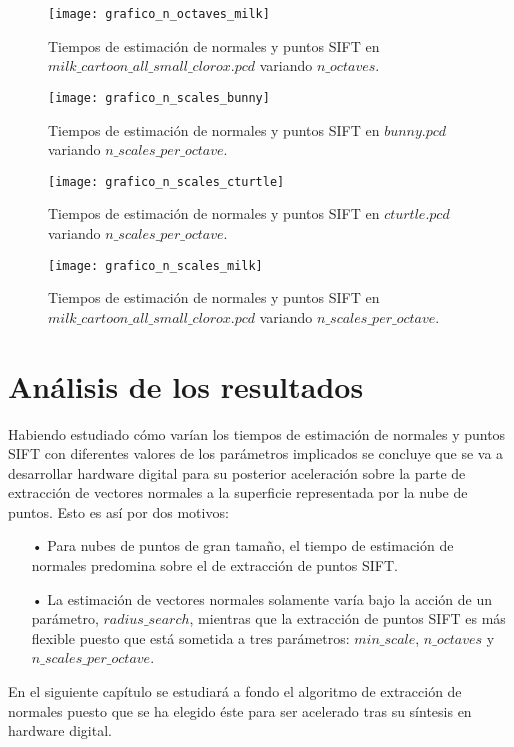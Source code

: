 \begin{figure}[h!]
\centering
\texttt{[image: grafico\_n\_octaves\_milk]}
\caption{Tiempos de estimación de normales y puntos SIFT en $milk\_cartoon\_all\_small\_clorox.pcd$ variando $n\_octaves$.}\label{fig:grafico_n_octaves_milk}
\end{figure}


\begin{figure}[h!]
\centering
\texttt{[image: grafico\_n\_scales\_bunny]}
\caption{Tiempos de estimación de normales y puntos SIFT en $bunny.pcd$ variando $n\_scales\_per\_octave$.}\label{fig:grafico_n_scales_bunny}
\end{figure}

\begin{figure}[h!]
\centering
\texttt{[image: grafico\_n\_scales\_cturtle]}
\caption{Tiempos de estimación de normales y puntos SIFT en $cturtle.pcd$ variando $n\_scales\_per\_octave$.}\label{fig:grafico_n_scales_cturtle}
\end{figure}


\begin{figure}[h!]
\centering
\texttt{[image: grafico\_n\_scales\_milk]}
\caption{Tiempos de estimación de normales y puntos SIFT en $milk\_cartoon\_all\_small\_clorox.pcd$ variando $n\_scales\_per\_octave$.}\label{fig:grafico_n_scales_milk}
\end{figure}


\section{Análisis de los resultados}
Habiendo estudiado cómo varían los tiempos de estimación de normales y puntos SIFT con diferentes valores de los parámetros implicados se concluye que se va a desarrollar hardware digital para su posterior aceleración sobre la parte de extracción de vectores normales a la superficie representada por la nube de puntos. Esto es así por dos motivos:

\begin{itemize}
\item[•]Para nubes de puntos de gran tamaño, el tiempo de estimación de normales predomina sobre el de extracción de puntos SIFT.
\item[•]La estimación de vectores normales solamente varía bajo la acción de un parámetro, $radius\_search$, mientras que la extracción de puntos SIFT es más flexible puesto que está sometida a tres parámetros: $min\_scale$, $n\_octaves$ y $n\_scales\_per\_octave$.
\end{itemize}

En el siguiente capítulo se estudiará a fondo el algoritmo de extracción de normales puesto que se ha elegido éste para ser acelerado tras su síntesis en hardware digital.
